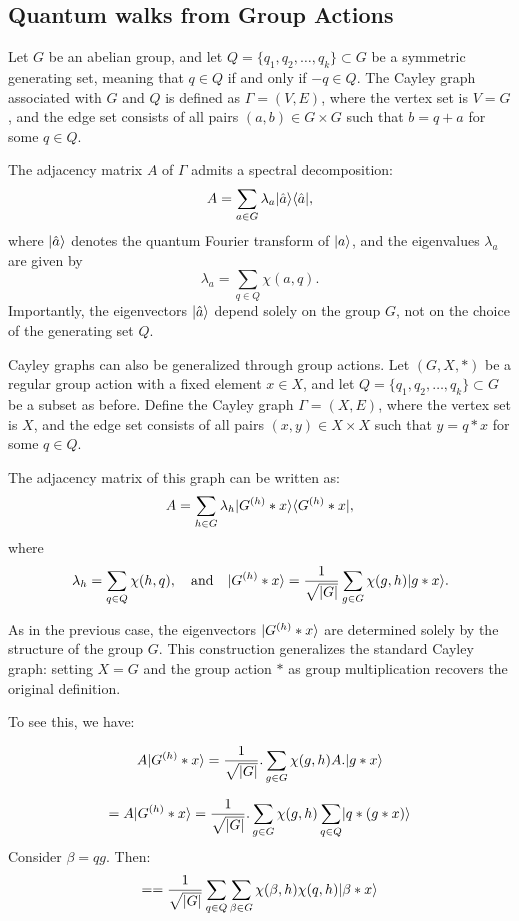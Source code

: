 \documentclass[11pt]{article}
\theoremstyle{definition}
\begin{document}
\subsection*{Quantum walks from Group Actions}


Let \( G \) be an abelian group, and let \( Q = \{q_1, q_2, \dots, q_k\} \subset G \) be a symmetric generating set, meaning that \( q \in Q \) if and only if \( -q \in Q \). The Cayley graph associated with \( G \) and \( Q \) is defined as \( \Gamma = (V, E) \), where the vertex set is \( V = G \), and the edge set consists of all pairs \( (a, b) \in G \times G \) such that \( b = q + a \) for some \( q \in Q \).

The adjacency matrix \( A \) of \( \Gamma \) admits a spectral decomposition:
\[
A = \sum_{a \in G} \lambda_a \lvert\hat{a}\rangle \langle\hat{a}\rvert,
\]
where \( \lvert\hat{a}\rangle \) denotes the quantum Fourier transform of \( \lvert a\rangle \), and the eigenvalues \( \lambda_a \) are given by
\[
\lambda_a = \sum_{q \in Q} \chi(a, q).
\]
Importantly, the eigenvectors \( \lvert\hat{a}\rangle \) depend solely on the group \( G \), not on the choice of the generating set \( Q \).

Cayley graphs can also be generalized through group actions. Let \( (G, X, *) \) be a regular group action with a fixed element \( x \in X \), and let \( Q = \{q_1, q_2, \dots, q_k\} \subset G \) be a subset as before. Define the Cayley graph \( \Gamma = (X, E) \), where the vertex set is \( X \), and the edge set consists of all pairs \( (x, y) \in X \times X \) such that \( y = q * x \) for some \( q \in Q \).

The adjacency matrix of this graph can be written as:
\[
A = \sum_{h \in G} \lambda_h \lvert G^{(h)} * x\rangle \langle G^{(h)} * x\rvert,
\]
where
\[
\lambda_h = \sum_{q \in Q} \chi(h, q), \quad \text{and} \quad \lvert G^{(h)} * x\rangle = \frac{1}{\sqrt{|G|}} \sum_{g \in G} \chi(g, h) \lvert g * x\rangle.
\]

As in the previous case, the eigenvectors \( \lvert G^{(h)} * x\rangle \) are determined solely by the structure of the group \( G \). This construction generalizes the standard Cayley graph: setting \( X = G \) and the group action \( * \) as group multiplication recovers the original definition.


To see this, we have:

\[
    A\lvert G^{(h)}*x\rangle = \frac{1}{\sqrt{|G|}}.\sum_{g \in G}\chi(g,h) A.\lvert g*x\rangle
    \]

    \[
    = A\lvert G^{(h)}*x\rangle = \frac{1}{\sqrt{|G|}}.\sum_{g \in G}\chi(g,h)\sum_{q \in Q}\lvert q*(g*x)\rangle
    \]
    Consider $\beta = qg$. Then:
    \[
    = = \frac{1}{\sqrt{|G|}}\sum_{q \in Q}\sum_{\beta \in G}\chi(\beta,h)\chi(q,h)\lvert\beta * x\rangle
    \]
\end{document}
